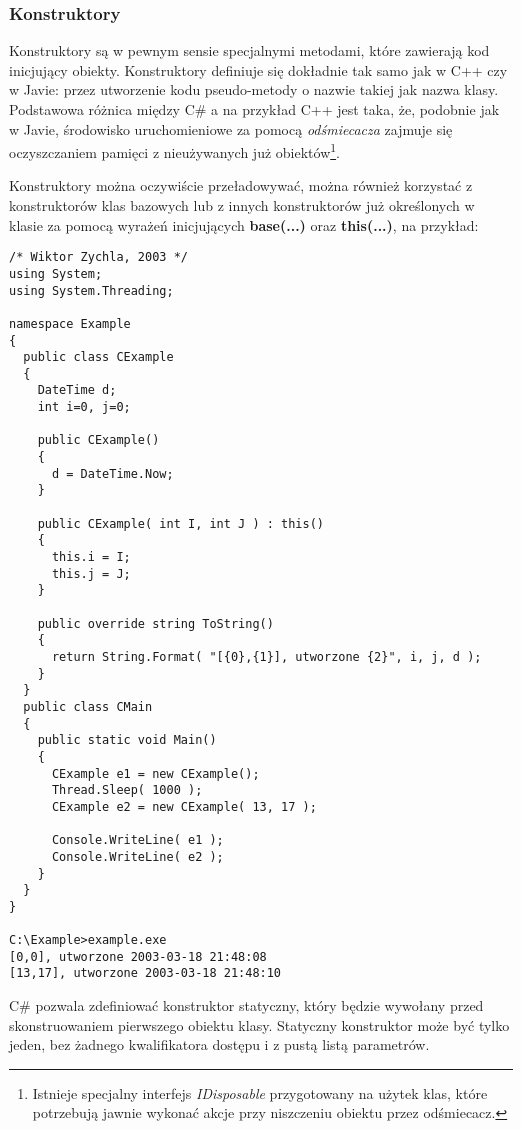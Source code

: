 \subsubsection{Konstruktory}

Konstruktory są w pewnym sensie specjalnymi metodami, które zawierają kod inicjujący obiekty. 
Konstruktory definiuje się dokładnie tak samo jak w C++ czy w Javie: przez utworzenie
kodu pseudo-metody o nazwie takiej jak nazwa klasy. 
Podstawowa różnica między C\# a na przykład C++ jest taka, że, podobnie jak w Javie, środowisko uruchomieniowe
za pomocą {\em odśmiecacza} zajmuje się oczyszczaniem pamięci z nieużywanych już obiektów\footnote{Istnieje
specjalny interfejs {\em IDisposable} przygotowany na użytek klas, które potrzebują jawnie wykonać akcje przy
niszczeniu obiektu przez odśmiecacz.}.

Konstruktory można oczywiście przeładowywać, można również korzystać z konstruktorów klas bazowych lub
z innych konstruktorów już określonych w klasie za pomocą wyrażeń inicjujących {\bf base(...)} oraz
{\bf this(...)}, na przykład:

\begin{scriptsize}
\begin{verbatim}
/* Wiktor Zychla, 2003 */
using System;
using System.Threading;

namespace Example
{
  public class CExample
  {
    DateTime d;
    int i=0, j=0;

    public CExample()
    {
      d = DateTime.Now;
    }

    public CExample( int I, int J ) : this()
    {
      this.i = I; 
      this.j = J;
    }

    public override string ToString()
    {
      return String.Format( "[{0},{1}], utworzone {2}", i, j, d );
    }
  }
  public class CMain
  {    
    public static void Main()
    {
      CExample e1 = new CExample();
      Thread.Sleep( 1000 );
      CExample e2 = new CExample( 13, 17 );

      Console.WriteLine( e1 );
      Console.WriteLine( e2 );
    }
  }
}

C:\Example>example.exe
[0,0], utworzone 2003-03-18 21:48:08
[13,17], utworzone 2003-03-18 21:48:10
\end{verbatim}
\end{scriptsize}

C\# pozwala zdefiniować konstruktor statyczny, który będzie wywołany przed skonstruowaniem
pierwszego obiektu klasy. Statyczny konstruktor może być tylko jeden, bez żadnego kwalifikatora dostępu i
z pustą listą parametrów.

